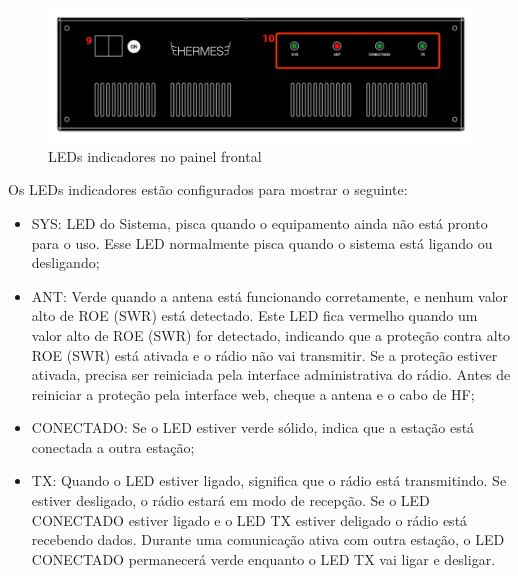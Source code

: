 \documentclass[11pt,a4paper]{article}
\begin{document}
\begin{figure}[!ht]
\includegraphics[width=1\textwidth]{pictures/front.png}
\caption{LEDs indicadores no painel frontal}
\label{fig:frontview}
\end{figure}
Os LEDs indicadores estão configurados para mostrar o seguinte:
\begin{itemize}
    \item SYS: LED do Sistema, pisca quando o equipamento ainda não está pronto para o uso. Esse LED normalmente pisca quando o sistema está ligando ou desligando;
    
    
    \item ANT: Verde quando a antena está funcionando corretamente, e nenhum valor alto de ROE (SWR) está detectado. Este LED fica vermelho quando um valor alto de ROE (SWR) for detectado, indicando que a proteção contra alto ROE (SWR) está ativada e o rádio não vai transmitir. Se a proteção estiver ativada, precisa ser reiniciada pela interface administrativa do rádio. Antes de reiniciar a proteção pela interface web, cheque a antena e o cabo de HF;
    
    \item CONECTADO: Se o LED estiver verde sólido, indica que a estação está conectada a outra estação;
    
    
     
    
    \item TX: Quando o LED estiver ligado, significa que o rádio está transmitindo. Se estiver desligado, o rádio estará em modo de recepção. Se o LED CONECTADO estiver ligado e o LED TX estiver deligado o rádio está recebendo dados. Durante uma comunicação ativa com outra estação, o LED CONECTADO permanecerá verde enquanto o LED TX vai ligar e desligar.
    
\end{itemize}
\end{document}
